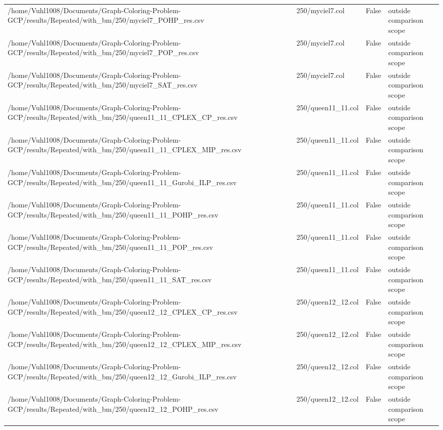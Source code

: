 \begin{table}[htbp]
\begin{tabular}{llll}
/home/Vuhl1008/Documents/Graph-Coloring-Problem-GCP/results/Repeated/with\_bm/250/myciel7\_POHP\_res.csv & 250/myciel7.col & False & outside comparison scope \\
/home/Vuhl1008/Documents/Graph-Coloring-Problem-GCP/results/Repeated/with\_bm/250/myciel7\_POP\_res.csv & 250/myciel7.col & False & outside comparison scope \\
/home/Vuhl1008/Documents/Graph-Coloring-Problem-GCP/results/Repeated/with\_bm/250/myciel7\_SAT\_res.csv & 250/myciel7.col & False & outside comparison scope \\
/home/Vuhl1008/Documents/Graph-Coloring-Problem-GCP/results/Repeated/with\_bm/250/queen11\_11\_CPLEX\_CP\_res.csv & 250/queen11\_11.col & False & outside comparison scope \\
/home/Vuhl1008/Documents/Graph-Coloring-Problem-GCP/results/Repeated/with\_bm/250/queen11\_11\_CPLEX\_MIP\_res.csv & 250/queen11\_11.col & False & outside comparison scope \\
/home/Vuhl1008/Documents/Graph-Coloring-Problem-GCP/results/Repeated/with\_bm/250/queen11\_11\_Gurobi\_ILP\_res.csv & 250/queen11\_11.col & False & outside comparison scope \\
/home/Vuhl1008/Documents/Graph-Coloring-Problem-GCP/results/Repeated/with\_bm/250/queen11\_11\_POHP\_res.csv & 250/queen11\_11.col & False & outside comparison scope \\
/home/Vuhl1008/Documents/Graph-Coloring-Problem-GCP/results/Repeated/with\_bm/250/queen11\_11\_POP\_res.csv & 250/queen11\_11.col & False & outside comparison scope \\
/home/Vuhl1008/Documents/Graph-Coloring-Problem-GCP/results/Repeated/with\_bm/250/queen11\_11\_SAT\_res.csv & 250/queen11\_11.col & False & outside comparison scope \\
/home/Vuhl1008/Documents/Graph-Coloring-Problem-GCP/results/Repeated/with\_bm/250/queen12\_12\_CPLEX\_CP\_res.csv & 250/queen12\_12.col & False & outside comparison scope \\
/home/Vuhl1008/Documents/Graph-Coloring-Problem-GCP/results/Repeated/with\_bm/250/queen12\_12\_CPLEX\_MIP\_res.csv & 250/queen12\_12.col & False & outside comparison scope \\
/home/Vuhl1008/Documents/Graph-Coloring-Problem-GCP/results/Repeated/with\_bm/250/queen12\_12\_Gurobi\_ILP\_res.csv & 250/queen12\_12.col & False & outside comparison scope \\
/home/Vuhl1008/Documents/Graph-Coloring-Problem-GCP/results/Repeated/with\_bm/250/queen12\_12\_POHP\_res.csv & 250/queen12\_12.col & False & outside comparison scope \\

\end{tabular}
\end{table}

